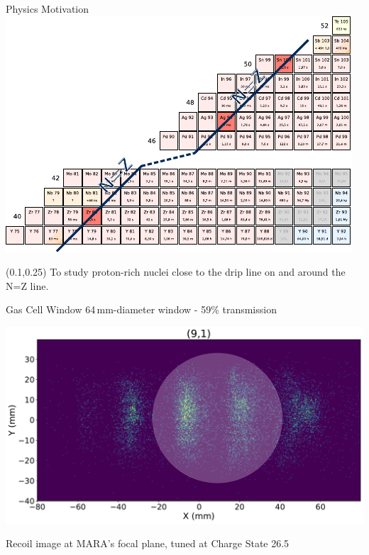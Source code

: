 \documentclass{beamer}
\begin{document}
\begin{frame}{Physics Motivation}
    \vspace*{0em}
    \centering
    \includegraphics[scale=1.3]{nuclides.pdf}
    \begin{textblock*}{0.5\textwidth}(0.1\textwidth,0.25\textheight)
        \flushleft
        To study proton-rich nuclei close to the drip line on and around the N=Z line.
    \end{textblock*}
\end{frame}
\begin{frame}{Gas Cell Window}
    \centering
    \vspace*{3em}
    64\,mm-diameter window - 59\% transmission

    \includegraphics[width=\textwidth]{Window2states.pdf} 
    
    Recoil image at MARA's focal plane, tuned at Charge State 26.5
\end{frame}
\end{document}
